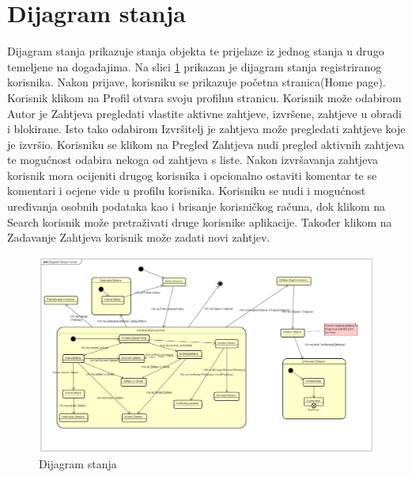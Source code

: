 \section{Dijagram stanja}
			
				
		
		\text Dijagram stanja prikazuje stanja objekta te prijelaze iz jednog stanja u drugo temeljene na dogadajima. Na slici
		\ref{fig:4.12} prikazan je dijagram stanja registriranog korisnika. Nakon prijave, korisniku se prikazuje početna stranica(Home page). Korisnik klikom na Profil otvara svoju profilnu stranicu. Korisnik može odabirom Autor je Zahtjeva pregledati vlastite aktivne zahtjeve, izvršene, zahtjeve u obradi i blokirane. Isto tako odabirom Izvršitelj je zahtjeva može pregledati zahtjeve koje je izvršio. Korisniku se klikom na Pregled Zahtjeva nudi pregled aktivnih zahtjeva te mogućnost odabira nekoga od zahtjeva s liste. Nakon izvršavanja zahtjeva korisnik mora ocijeniti drugog korisnika i opcionalno ostaviti komentar te se komentari i ocjene vide u profilu korisnika. Korisniku se nudi i mogućnost uređivanja osobnih podataka kao i brisanje korisničkog računa, dok klikom  na Search korisnik može pretraživati druge korisnike aplikacije. Također klikom na Zadavanje Zahtjeva korisnik može zadati novi zahtjev.
		
		\begin{figure}[H]
			\includegraphics[scale=0.3]{slike/Dijagram Stanja Korisnik.png} %
			\centering
			\caption { Dijagram stanja}
			\label{fig:4.12}
			\end{figure}		
			

\newpage
